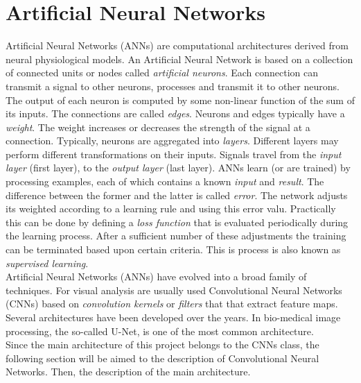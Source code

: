 \documentclass{standalone}
\begin{document}
\chapter{Artificial Neural Networks}
Artificial Neural Networks (ANNs) are computational architectures derived from neural physiological models\cite{segmentationreview}.
An Artificial Neural Network is based on a collection of connected units or nodes called \textit{artificial neurons}. 
Each connection can transmit a signal to other neurons, processes and transmit it to other neurons. 
The output of each neuron is computed by some non-linear function of the sum of its inputs. 
The connections are called \textit{edges}. 
Neurons and edges typically have a \textit{weight}. 
The weight increases or decreases the strength of the signal at a connection. 
Typically, neurons are aggregated into \textit{layers}. 
Different layers may perform different transformations on their inputs. 
Signals travel from the \textit{input layer} (first layer), to the \textit{output layer} (last layer).
ANNs learn (or are trained) by processing examples, each of which contains a known \textit{input} and \textit{result}.
The difference between the former and the latter is called \textit{error}.
The network adjusts its weighted according to a learning rule and using this error valu.
Practically this can be done by defining a \textit{loss function} that is evaluated periodically during the learning process.
After a sufficient number of these adjustments the training can be terminated based upon certain criteria. 
This is process is also known as \textit{supervised learning}\cite{wiki:ann}.\\
Artificial Neural Networks (ANNs) have evolved into a broad family of techniques\cite{segmentationreview}.
For visual analysis are usually used Convolutional Neural Networks (CNNs) based on \textit{convolution kernels} or \textit{filters} that that extract feature maps\cite{wiki:cnn}.
Several architectures have been developed over the years.
In bio-medical image processing, the so-called U-Net\cite{unet}, is one of the most common architecture.\\
Since the main architecture of this project belongs to the CNNs class, the following section will be aimed to the description of Convolutional Neural Networks.
Then, the description of the main architecture.
\end{document}
